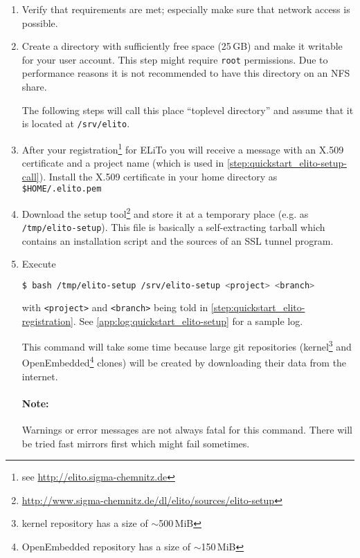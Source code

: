 \begin{enumerate}
\item Verify that requirements are met; especially make sure that
  network access is possible.
\item Create a directory with sufficiently free space (25\,GB) and make
  it writable for your user account.  This step might require
  \texttt{root} permissions.  Due to performance reasons it is not
  recommended to have this directory on an NFS share.

  The following steps will call this place ``toplevel directory''
  and assume that it is located at \texttt{/srv/elito}.
\item\label{step:quickstart_elito-registration} After your
  registration\footnote{see \url{http://elito.sigma-chemnitz.de}} for
  ELiTo you will receive a message with an X.509 certificate and a
  project name (which is used in
  \autoref{step:quickstart_elito-setup-call}).  Install the X.509
  certificate in your home directory as \texttt{\$HOME/.elito.pem}
\item Download the setup
  tool\footnote{\url{http://www.sigma-chemnitz.de/dl/elito/sources/elito-setup}}
  and store it at a temporary place (e.g. as
  \texttt{/tmp/elito-setup}).  This file is basically a
  self-extracting tarball which contains an installation script and
  the sources of an SSL tunnel program.
\item\label{step:quickstart_elito-setup-call} Execute
\begin{lstlisting}[language=bash]
$ bash /tmp/elito-setup /srv/elito-setup <project> <branch>
\end{lstlisting}%
  with \texttt{<project>} and \texttt{<branch>} being told in
  \autoref{step:quickstart_elito-registration}. See
  \autoref{app:log:quickstart_elito-setup} for a sample log.

  This command will take some time because large git repositories
  (kernel\footnote{kernel repository has a size of $\sim$500\,MiB} and
  OpenEmbedded\footnote{OpenEmbedded repository has a size of
    $\sim$150\,MiB} clones) will be created by downloading their data
  from the internet.

  \paragraph{Note:} Warnings or error messages are not always fatal for
  this command.  There will be tried fast mirrors first which might
  fail sometimes.
\end{enumerate}

